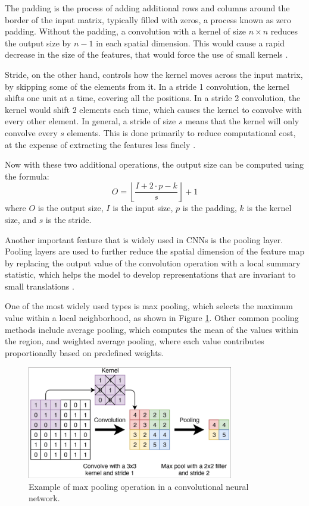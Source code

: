 The padding is the process of adding additional rows and columns around the border of the input matrix, typically filled with zeros, a process known as zero padding. Without the padding, a convolution with a kernel of size $n\times n$ reduces the output size by $n-1$ in each spatial dimension. This would cause a rapid decrease in the size of the features, that would force the use of small kernels \cite{Goodfellow_Bengio_Courville_2018}.

Stride, on the other hand, controls how the kernel moves across the input matrix, by skipping some of the elements from it. In a stride 1 convolution, the kernel shifts one unit at a time, covering all the positions. In a stride 2 convolution, the kernel would shift 2 elements each time, which causes the kernel to convolve with every other element. In general, a stride of size $s$ means that the kernel will only convolve every $s$ elements. This is done primarily to reduce computational cost, at the expense of extracting the features less finely \cite{Goodfellow_Bengio_Courville_2018}. 

Now with these two additional operations, the output size can be computed using the formula:
\begin{equation}
    O = \left\lfloor \frac{I + 2 \cdot p - k}{s} \right\rfloor + 1
    \label{eq:conv_output}
\end{equation}
where $O$ is the output size, $I$ is the input size, $p$ is the padding, $k$ is the kernel size, and $s$ is the stride.

Another important feature that is widely used in CNNs is the pooling layer. Pooling layers are used to further reduce the spatial dimension of the feature map by replacing the output value of the convolution operation with a local summary statistic, which helps the model to develop representations that are invariant to small translations \cite{Goodfellow_Bengio_Courville_2018}. 

One of the most widely used types is max pooling, which selects the maximum value within a local neighborhood, as shown in Figure \ref{fig:pooling-example}. Other common pooling methods include average pooling, which computes the mean of the values within the region, and weighted average pooling, where each value contributes proportionally based on predefined weights.

\begin{figure}[H]
    \centering
    \includegraphics[width=9cm]{Cap2_LitReview/model_basics/Convolutional_NN/Schematic-representation-of-a-convolution-and-pooling-layer-in-a-CNN.png}
    \caption{Example of max pooling operation in a convolutional neural network. \cite{Verschoof-van}}
    \label{fig:pooling-example}
\end{figure}

